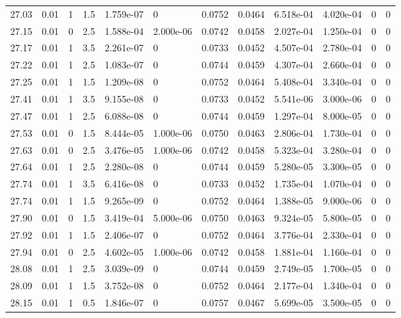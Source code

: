 \documentclass[preview]{standalone}
\begin{document}
{{{{{{{{{\begin{tabular}{L{1.2cm}C{1.2cm} C{0.3cm}C{0.5cm} C{1.4cm}C{1.4cm} C{1.4cm}C{1.4cm} C{1.6cm}C{1.6cm} C{1.6cm}C{1.6cm}}
  27.03  &  0.01  & 1     & 1.5 &  1.759e-07  & 0  &  0.0752&   0.0464& 6.518e-04 & 4.020e-04   &  0 & 0  \\ 
  27.15  &  0.01  & 0     & 2.5 &  1.588e-04  & 2.000e-06  &  0.0742&   0.0458& 2.027e-04 & 1.250e-04   &  0 & 0  \\ 
  27.17  &  0.01  & 1     & 3.5 &  2.261e-07  & 0  &  0.0733&   0.0452& 4.507e-04 & 2.780e-04   &  0 & 0  \\ 
  27.22  &  0.01  & 1     & 2.5 &  1.083e-07  & 0  &  0.0744&   0.0459& 4.307e-04 & 2.660e-04   &  0 & 0  \\ 
  27.25  &  0.01  & 1     & 1.5 &  1.209e-08  & 0  &  0.0752&   0.0464& 5.408e-04 & 3.340e-04   &  0 & 0  \\ 
  27.41  &  0.01  & 1     & 3.5 &  9.155e-08  & 0  &  0.0733&   0.0452& 5.541e-06 & 3.000e-06   &  0 & 0  \\ 
  27.47  &  0.01  & 1     & 2.5 &  6.088e-08  & 0  &  0.0744&   0.0459& 1.297e-04 & 8.000e-05   &  0 & 0  \\ 
  27.53  &  0.01  & 0     & 1.5 &  8.444e-05  & 1.000e-06  &  0.0750&   0.0463& 2.806e-04 & 1.730e-04   &  0 & 0  \\ 
  27.63  &  0.01  & 0     & 2.5 &  3.476e-05  & 1.000e-06  &  0.0742&   0.0458& 5.323e-04 & 3.280e-04   &  0 & 0  \\ 
  27.64  &  0.01  & 1     & 2.5 &  2.280e-08  & 0  &  0.0744&   0.0459& 5.280e-05 & 3.300e-05   &  0 & 0  \\ 
  27.74  &  0.01  & 1     & 3.5 &  6.416e-08  & 0  &  0.0733&   0.0452& 1.735e-04 & 1.070e-04   &  0 & 0  \\ 
  27.74  &  0.01  & 1     & 1.5 &  9.265e-09  & 0  &  0.0752&   0.0464& 1.388e-05 & 9.000e-06   &  0 & 0  \\ 
  27.90  &  0.01  & 0     & 1.5 &  3.419e-04  & 5.000e-06  &  0.0750&   0.0463& 9.324e-05 & 5.800e-05   &  0 & 0  \\ 
  27.92  &  0.01  & 1     & 1.5 &  2.406e-07  & 0  &  0.0752&   0.0464& 3.776e-04 & 2.330e-04   &  0 & 0  \\ 
  27.94  &  0.01  & 0     & 2.5 &  4.602e-05  & 1.000e-06  &  0.0742&   0.0458& 1.881e-04 & 1.160e-04   &  0 & 0  \\ 
  28.08  &  0.01  & 1     & 2.5 &  3.039e-09  & 0  &  0.0744&   0.0459& 2.749e-05 & 1.700e-05   &  0 & 0  \\ 
  28.09  &  0.01  & 1     & 1.5 &  3.752e-08  & 0  &  0.0752&   0.0464& 2.177e-04 & 1.340e-04   &  0 & 0  \\ 
  28.15  &  0.01  & 1     & 0.5 &  1.846e-07  & 0  &  0.0757&   0.0467& 5.699e-05 & 3.500e-05   &  0 & 0  \\ 

\end{tabular}}}}}}}}}}
\end{document}
